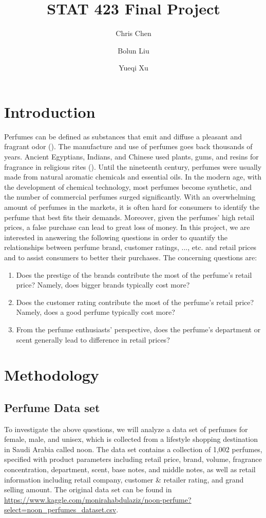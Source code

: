 \documentclass[12pt]{amsart}
\begin{document}
\author{Chris Chen}
\author{Bolun Liu}
\author{Yueqi Xu}
\title{STAT 423 Final Project}

\maketitle
\section{Introduction}
\label{sec: intro}
Perfumes can be defined as substances that emit and diffuse a pleasant and fragrant odor (\cite{perfume}). The manufacture and use of perfumes goes back thousands of years. Ancient Egyptians, Indians, and Chinese used plants, gums, and resins for fragrance in religious rites (\cite{perfume}). Until the nineteenth century, perfumes were usually made from natural aromatic chemicals and essential oils. In the modern age, with the development of chemical technology, most perfumes become synthetic, and the number of commercial perfumes surged significantly. With an overwhelming amount of perfumes in the markets, it is often hard for consumers to identify the perfume that best fits their demands. Moreover, given the perfumes' high retail prices, a false purchase can lead to great loss of money. In this project, we are interested in answering the following questions in order to quantify the relationships between perfume brand, customer ratings, $...$, etc. and retail prices and to assist consumers to better their purchases. The concerning questions are:

\begin{enumerate}
    \item Does the prestige of the brands contribute the most of the perfume's retail price? Namely, does bigger
brands typically cost more?
\item Does the customer rating contribute the most of the perfume's retail price? Namely, does a good perfume typically cost more?
\item From the perfume enthusiasts' perspective, does the perfume's department or scent generally lead to difference in retail prices? 
\end{enumerate}

\section{Methodology}

\subsection{Perfume Data set}
To investigate the above questions, we will analyze a data set of perfumes for female, male, and unisex, which is collected from a lifestyle shopping destination in Saudi Arabia called noon. The data set contains a collection of 1,002 perfumes, specified with
product parameters including retail price, brand, volume, fragrance concentration, department, scent, base notes, and middle notes, as well as retail information including retail company, customer \& retailer rating, and grand selling amount. The original data set can be found in \url{https://www.kaggle.com/monirahabdulaziz/noon-perfume?select=noon_perfumes_dataset.csv}. 
\end{document}
